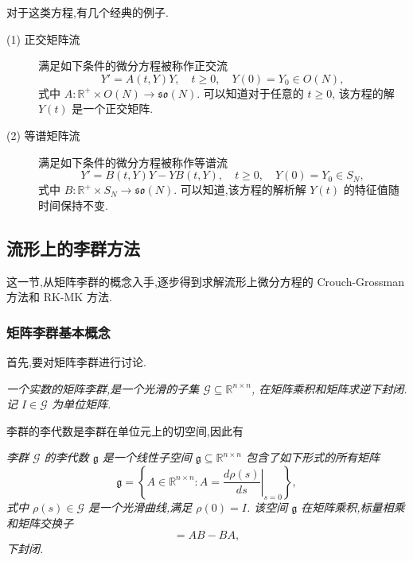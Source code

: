 对于这类方程,有几个经典的例子.
\begin{description}
	\item[(1) 正交矩阵流] 满足如下条件的微分方程被称作正交流
	\begin{equation*}
		Y'=A(t,Y)Y,\quad t\geq 0,\quad Y(0)=Y_0\in O(N),
	\end{equation*}
	式中 $A:\mathbb{R}^+\times O(N)\to \mathfrak{so}(N)$. 可以知道对于任意的 $t\geq 0$, 该方程的解 $Y(t)$ 是一个正交矩阵.
	\item[(2) 等谱矩阵流] 满足如下条件的微分方程被称作等谱流
	\begin{equation*}
		Y'=B(t,Y)Y-YB(t,Y),\quad t\geq 0,\quad Y(0)=Y_0\in S_N,
	\end{equation*}
	式中 $B:\mathbb{R}^+\times S_N\to \mathfrak{so}(N)$. 可以知道,该方程的解析解 $Y(t)$ 的特征值随时间保持不变.
\end{description}

\subsection{流形上的李群方法}
这一节,从矩阵李群的概念入手,逐步得到求解流形上微分方程的 Crouch-Grossman 方法和 RK-MK 方法.

\subsubsection{矩阵李群基本概念}

首先,要对矩阵李群进行讨论.
\begin{definition}
	\emph{一个实数的矩阵李群,是一个光滑的子集 $\mathcal{G}\subseteq \mathbb{R}^{n\times n}$, 在矩阵乘积和矩阵求逆下封闭.记 $I\in \mathcal{G}$ 为单位矩阵.}
\end{definition}

李群的李代数是李群在单位元上的切空间,因此有
\begin{definition}
	\emph{李群 $\mathcal{G}$ 的李代数 $\mathfrak{g}$ 是一个线性子空间 $\mathfrak{g}\subseteq \mathbb{R}^{n\times n}$ 包含了如下形式的所有矩阵
	\begin{equation*}
		\mathfrak{g} = \left\lbrace A \in \mathbb{R}^{n\times n}:A=\left.\frac{d\rho(s)}{ds}\right|_{s=0}\right\rbrace,
	\end{equation*}
	式中 $\rho(s)\in \mathcal{G}$ 是一个光滑曲线,满足 $\rho(0)=I$. 该空间 $\mathfrak{g}$ 在矩阵乘积,标量相乘和矩阵交换子
	\begin{equation*}
		[A,B]=AB-BA,
	\end{equation*}
	下封闭.}
\end{definition}

